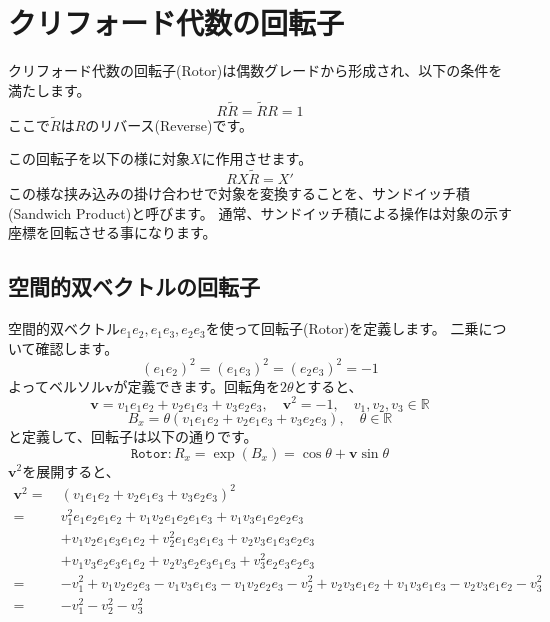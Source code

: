 \documentclass[a4paper,12pt,notitlepage]{jsreport}
\begin{document}
\section{クリフォード代数の回転子}

クリフォード代数の回転子(Rotor)は偶数グレードから形成され、以下の条件を満たします。
\begin{equation}
  R\widetilde{R}=\widetilde{R}R=1
\end{equation}
ここで$\widetilde{R}$は$R$のリバース(Reverse)です。

この回転子を以下の様に対象$X$に作用させます。
\begin{equation}
  R X \widetilde{R} = X'
\end{equation}
この様な挟み込みの掛け合わせで対象を変換することを、サンドイッチ積(Sandwich Product)と呼びます。
通常、サンドイッチ積による操作は対象の示す座標を回転させる事になります。

\subsection{空間的双ベクトルの回転子}

空間的双ベクトル$e_1e_2,e_1e_3,e_2e_3$を使って回転子(Rotor)を定義します。
二乗について確認します。
\begin{equation}
  (e_1e_2)^2 = (e_1e_3)^2 = (e_2e_3)^2 = -1
\end{equation}
よってベルソル$\bm{v}$が定義できます。回転角を$2\theta$とすると、
\begin{equation}
  \bm{v} = v_1 e_1e_2 + v_2 e_1e_3 + v_3 e_2e_3 , \quad
  \bm{v}^2 = - 1 , \quad v_1 , v_2 , v_3 \in \mathbb{R}
\end{equation}
\begin{equation}
  B_x = \theta (v_1 e_1e_2 + v_2 e_1e_3 + v_3 e_2e_3) , \quad \theta \in \mathbb{R}
\end{equation}
と定義して、回転子は以下の通りです。
\begin{equation}
  \texttt{Rotor} : R_x = \exp(B_x) = \cos \theta + \bm{v} \sin \theta
\end{equation}
$\bm{v}^2$を展開すると、
\begin{equation}
  \begin{split}
    \bm{v}^2 = ~ & (v_1 e_1e_2 + v_2 e_1e_3 + v_3 e_2e_3)^2\\
    = ~ & v_1^2 e_1e_2e_1e_2 + v_1 v_2 e_1e_2e_1e_3 + v_1 v_3 e_1e_2e_2e_3\\
    & + v_1 v_2 e_1e_3e_1e_2 + v_2^2 e_1e_3e_1e_3 + v_2 v_3 e_1e_3e_2e_3\\
    & + v_1 v_3 e_2e_3e_1e_2 + v_2 v_3 e_2e_3e_1e_3 + v_3^2 e_2e_3e_2e_3\\
    = ~ & - v_1^2 + v_1 v_2 e_2e_3 - v_1 v_3 e_1e_3
    - v_1 v_2 e_2e_3 - v_2^2 + v_2 v_3 e_1e_2
    + v_1 v_3 e_1e_3 - v_2 v_3 e_1e_2 - v_3^2\\
    = ~ & - v_1^2 - v_2^2 - v_3^2\\
  \end{split}
\end{equation}
\end{document}
